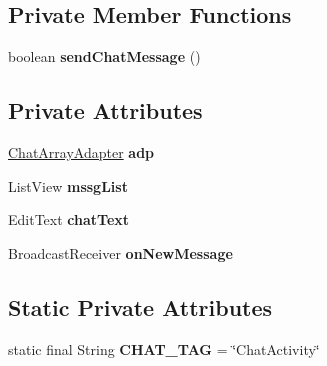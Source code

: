 \subsection*{Private Member Functions}
\begin{DoxyCompactItemize}
\item 
boolean {\bfseries send\+Chat\+Message} ()\hypertarget{classcom_1_1example_1_1sebastian_1_1tindertp_1_1ChatActivity_ae2d5caecba6e1cdfcc3ef5c7d704deb7}{}\label{classcom_1_1example_1_1sebastian_1_1tindertp_1_1ChatActivity_ae2d5caecba6e1cdfcc3ef5c7d704deb7}

\end{DoxyCompactItemize}
\subsection*{Private Attributes}
\begin{DoxyCompactItemize}
\item 
\hyperlink{classcom_1_1example_1_1sebastian_1_1tindertp_1_1chatTools_1_1ChatArrayAdapter}{Chat\+Array\+Adapter} {\bfseries adp}\hypertarget{classcom_1_1example_1_1sebastian_1_1tindertp_1_1ChatActivity_a03e16fc7e3d7977fafbdef72d8d462c3}{}\label{classcom_1_1example_1_1sebastian_1_1tindertp_1_1ChatActivity_a03e16fc7e3d7977fafbdef72d8d462c3}

\item 
List\+View {\bfseries mssg\+List}\hypertarget{classcom_1_1example_1_1sebastian_1_1tindertp_1_1ChatActivity_a3516f5b7ee537da41ee12f7a164dfce0}{}\label{classcom_1_1example_1_1sebastian_1_1tindertp_1_1ChatActivity_a3516f5b7ee537da41ee12f7a164dfce0}

\item 
Edit\+Text {\bfseries chat\+Text}\hypertarget{classcom_1_1example_1_1sebastian_1_1tindertp_1_1ChatActivity_ae0a631cc765cb3fe6f952bda309b7a5f}{}\label{classcom_1_1example_1_1sebastian_1_1tindertp_1_1ChatActivity_ae0a631cc765cb3fe6f952bda309b7a5f}

\item 
Broadcast\+Receiver {\bfseries on\+New\+Message}
\end{DoxyCompactItemize}
\subsection*{Static Private Attributes}
\begin{DoxyCompactItemize}
\item 
static final String {\bfseries C\+H\+A\+T\+\_\+\+T\+AG} = \char`\"{}Chat\+Activity\char`\"{}\hypertarget{classcom_1_1example_1_1sebastian_1_1tindertp_1_1ChatActivity_af470a6da122f68a052675a3168057ac0}{}\label{classcom_1_1example_1_1sebastian_1_1tindertp_1_1ChatActivity_af470a6da122f68a052675a3168057ac0}

\end{DoxyCompactItemize}



